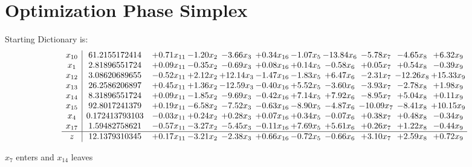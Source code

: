 \documentclass[9pt]{article}
\begin{document}
\section{Optimization Phase Simplex}
Starting Dictionary is:
\[\begin{array}{c| c c@{\hskip 2pt} c@{\hskip 2pt} c@{\hskip 2pt} c@{\hskip 2pt} c@{\hskip 2pt} c@{\hskip 2pt} c@{\hskip 2pt} c@{\hskip 2pt} c@{\hskip 2pt} }
 x_{10}   &  61.2155172414 & +  0.71 x_{11} & -1.20 x_{2} & -3.66 x_{3} & +  0.34 x_{16} & -1.07 x_{5} & -13.84 x_{6} & -5.78 x_{7} & -4.65 x_{8} & +  6.32 x_{9}\\
 x_{1}   &  2.81896551724 & +  0.09 x_{11} & -0.35 x_{2} & -0.69 x_{3} & +  0.08 x_{16} & +  0.14 x_{5} & -0.58 x_{6} & +  0.05 x_{7} & +  0.54 x_{8} & -0.39 x_{9}\\
 x_{12}   &  3.08620689655 & -0.52 x_{11} & +  2.12 x_{2} & + 12.14 x_{3} & -1.47 x_{16} & -1.83 x_{5} & +  6.47 x_{6} & -2.31 x_{7} & -12.26 x_{8} & + 15.33 x_{9}\\
 x_{13}   &  26.2586206897 & +  0.45 x_{11} & +  1.36 x_{2} & -12.59 x_{3} & -0.40 x_{16} & +  5.52 x_{5} & -3.60 x_{6} & -3.93 x_{7} & -2.78 x_{8} & +  1.98 x_{9}\\
 x_{14}   &  8.31896551724 & +  0.09 x_{11} & -1.85 x_{2} & -9.69 x_{3} & -0.42 x_{16} & +  7.14 x_{5} & +  7.92 x_{6} & -8.95 x_{7} & +  5.04 x_{8} & +  0.11 x_{9}\\
 x_{15}   &  92.8017241379 & +  0.19 x_{11} & -6.58 x_{2} & -7.52 x_{3} & -0.63 x_{16} & -8.90 x_{5} & -4.87 x_{6} & -10.09 x_{7} & -8.41 x_{8} & + 10.15 x_{9}\\
 x_{4}   &  0.172413793103 & -0.03 x_{11} & +  0.24 x_{2} & +  0.28 x_{3} & +  0.07 x_{16} & +  0.34 x_{5} & -0.07 x_{6} & +  0.38 x_{7} & +  0.48 x_{8} & -0.34 x_{9}\\
 x_{17}   &  1.59482758621 & -0.57 x_{11} & -3.27 x_{2} & -5.45 x_{3} & -0.11 x_{16} & +  7.69 x_{5} & +  5.61 x_{6} & +  0.26 x_{7} & +  1.22 x_{8} & -0.44 x_{9}\\
\hline
z    &  12.1379310345 & +  0.17 x_{11} & -3.21 x_{2} & -2.38 x_{3} & +  0.66 x_{16} & -0.72 x_{5} & -0.66 x_{6} & +  3.10 x_{7} & +  2.59 x_{8} & +  0.72 x_{9}\\
\end{array}\]


 $ x_{7} $ enters and $ x_{14} $ leaves 
\end{document}
